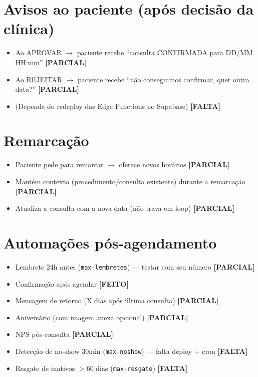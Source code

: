 \documentclass[11pt,a4paper]{article}
\newcommand{\sok}{\textcolor{verde}{\textbf{[FEITO]}}}
\newcommand{\sparc}{\textcolor{ambar}{\textbf{[PARCIAL]}}}
\newcommand{\sfalta}{\textcolor{vermelho}{\textbf{[FALTA]}}}
\begin{document}
\section{Avisos ao paciente (ap\'os decis\~ao da cl\'inica)}
\begin{itemize}
  \item Ao APROVAR $\rightarrow$ paciente recebe ``consulta CONFIRMADA para DD/MM HH:mm'' \sparc
  \item Ao REJEITAR $\rightarrow$ paciente recebe ``n\~ao conseguimos confirmar, quer outra data?'' \sparc
  \item (Depende do redeploy das Edge Functions no Supabase) \sfalta
\end{itemize}

\section{Remarca\c{c}\~ao}
\begin{itemize}
  \item Paciente pede para remarcar $\rightarrow$ oferece novos hor\'arios \sparc
  \item Mant\'em contexto (procedimento/consulta existente) durante a remarca\c{c}\~ao \sparc
  \item Atualiza a consulta com a nova data (n\~ao trava em loop) \sparc
\end{itemize}

\section{Automa\c{c}\~oes p\'os-agendamento}
\begin{itemize}
  \item Lembrete 24h antes (\texttt{max-lembretes}) --- testar com seu n\'umero \sparc
  \item Confirma\c{c}\~ao ap\'os agendar \sok
  \item Mensagem de retorno (X dias ap\'os \'ultima consulta) \sparc
  \item Anivers\'ario (com imagem anexa opcional) \sparc
  \item NPS p\'os-consulta \sparc
  \item Detec\c{c}\~ao de no-show 30min (\texttt{max-noshow}) --- falta deploy + cron \sfalta
  \item Resgate de inativos $>$60 dias (\texttt{max-resgate}) \sfalta
\end{itemize}
\end{document}
